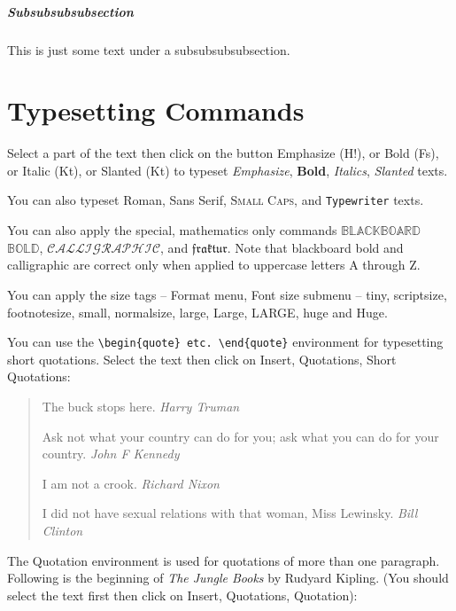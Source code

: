 \documentclass{amsbook}%
\theoremstyle{plain}
\numberwithin{equation}{section}
\begin{document}
\subparagraph{Subsubsubsubsection}

This is just some text under a subsubsubsubsection.

\section{Typesetting Commands}

Select a part of the text then click on the button Emphasize (H!),
or Bold (Fs), or Italic (Kt), or Slanted (Kt) to typeset
\emph{Emphasize}, \textbf{Bold}, \textit{Italics},
\textsl{Slanted} texts.

You can also typeset \textrm{Roman}, \textsf{Sans Serif},
\textsc{Small Caps}, and \texttt{Typewriter} texts.

You can also apply the special, mathematics only commands
$\mathbb{BLACKBOARD}$ $\mathbb{BOLD}$, $\mathcal{CALLIGRAPHIC}$,
and $\mathfrak{fraktur}$. Note that blackboard bold and
calligraphic are correct only when applied to uppercase letters A
through Z.

You can apply the size tags -- Format menu, Font size submenu --
{\tiny tiny}, {\scriptsize scriptsize}, {\footnotesize
footnotesize}, {\small small}, {\normalsize normalsize}, {\large
large}, {\Large Large}, {\LARGE LARGE}, {\huge huge} and {\Huge
Huge}.

You can use the \verb"\begin{quote} etc. \end{quote}" environment
for typesetting short quotations. Select the text then click on
Insert, Quotations, Short Quotations:

\begin{quote}
The buck stops here. \emph{Harry Truman}

Ask not what your country can do for you; ask what you can do for
your country. \emph{John F Kennedy}

I am not a crook. \emph{Richard Nixon}

I did not have sexual relations with that woman, Miss Lewinsky.
\emph{Bill Clinton}
\end{quote}

The Quotation environment is used for quotations of more than one
paragraph. Following is the beginning of \emph{The Jungle Books}
by Rudyard Kipling. (You should select the text first then click
on Insert, Quotations, Quotation):
\end{document}
